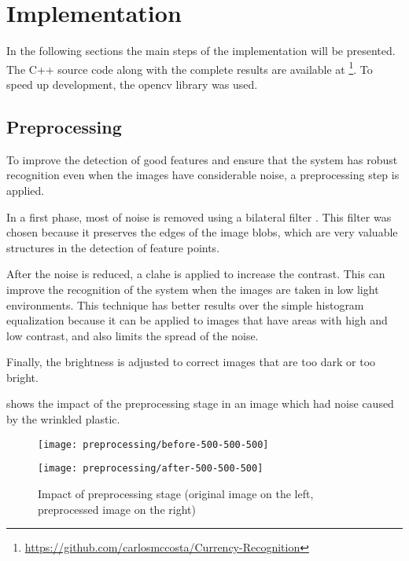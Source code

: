 \section{Implementation}\label{sec:implementation}

In the following sections the main steps of the implementation will be presented. The C++ source code along with the complete results are available at \footnote{\url{https://github.com/carlosmccosta/Currency-Recognition}}. To speed up development, the \gls{opencv} library was used.


\subsection{Preprocessing}

To improve the detection of good features and ensure that the system has robust recognition even when the images have considerable noise, a preprocessing step is applied.

In a first phase, most of noise is removed using a bilateral filter \cite{Tomasi1998}. This filter was chosen because it preserves the edges of the image blobs, which are very valuable structures in the detection of feature points.

After the noise is reduced, a \gls{clahe} \cite{Heckbert1994} is applied to increase the contrast. This can improve the recognition of the system when the images are taken in low light environments. This technique has better results over the simple histogram equalization because it can be applied to images that have areas with high and low contrast, and also limits the spread of the noise.

Finally, the brightness is adjusted to correct images that are too dark or too bright.

 shows the impact of the preprocessing stage in an image which had noise caused by the wrinkled plastic.

\begin{figure}[H]
	\centering
	\begin{minipage}[h]{.498\textwidth}
		\centering
		\texttt{[image: preprocessing/before-500-500-500]}
	\end{minipage}\hfill
	\begin{minipage}[h]{.498\textwidth}
		\centering
		\texttt{[image: preprocessing/after-500-500-500]}
	\end{minipage}
	\caption{Impact of preprocessing stage (original image on the left, preprocessed image on the right)}
	\label{fig:preprocessing}
\end{figure}


